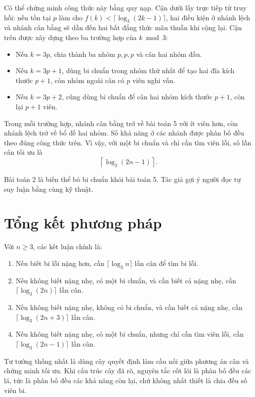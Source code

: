 \documentclass[11pt]{article}
\begin{document}
Có thể chứng minh công thức này bằng quy nạp. Cận dưới lấy trực tiếp từ truy
hồi: nếu tồn tại \(p\) làm cho \(f(k)<\lceil\log_3(2k-1)\rceil\), hai điều
kiện ở nhánh lệch và nhánh cân bằng sẽ dẫn đến hai bất đẳng thức mâu thuẫn
khi cộng lại. Cận trên được xây dựng theo ba trường hợp của \(k\bmod 3\):

\begin{itemize}
  \item Nếu \(k=3p\), chia thành ba nhóm \(p,p,p\) và cân hai nhóm đầu.
  \item Nếu \(k=3p+1\), dùng bi chuẩn trong nhóm thứ nhất để tạo hai đĩa kích
  thước \(p+1\), còn nhóm ngoài cân có \(p\) viên nghi vấn.
  \item Nếu \(k=3p+2\), cũng dùng bi chuẩn để cân hai nhóm kích thước
  \(p+1\), còn lại \(p+1\) viên.
\end{itemize}

Trong mỗi trường hợp, nhánh cân bằng trở về bài toán 5 với ít viên hơn, còn
nhánh lệch trở về bổ đề hai nhóm. Số khả năng ở các nhánh được phân bố đều
theo đúng công thức trên. Vì vậy, với một bi chuẩn và chỉ cần tìm viên lỗi,
số lần cân tối ưu là
\[
  \left\lceil \log_3(2n-1) \right\rceil .
\]

Bài toán 2 là biến thể bỏ bi chuẩn khỏi bài toán 5. Tác giả gợi ý người đọc
tự suy luận bằng cùng kỹ thuật.

\section{Tổng kết phương pháp}

Với \(n\ge 3\), các kết luận chính là:

\begin{enumerate}
  \item Nếu biết bi lỗi nặng hơn, cần
  \(\lceil\log_3 n\rceil\) lần cân để tìm bi lỗi.
  \item Nếu không biết nặng nhẹ, có một bi chuẩn, và cần biết cả nặng nhẹ, cần
  \(\lceil\log_3(2n)\rceil\) lần cân.
  \item Nếu không biết nặng nhẹ, không có bi chuẩn, và cần biết cả nặng nhẹ,
  cần \(\lceil\log_3(2n+3)\rceil\) lần cân.
  \item Nếu không biết nặng nhẹ, có một bi chuẩn, nhưng chỉ cần tìm viên lỗi,
  cần \(\lceil\log_3(2n-1)\rceil\) lần cân.
\end{enumerate}

Tư tưởng thống nhất là dùng cây quyết định làm cầu nối giữa phương án cân và
chứng minh tối ưu. Khi cấu trúc cây đã rõ, nguyên tắc cốt lõi là phân bố đều
các lá, tức là phân bố đều các khả năng còn lại, chứ không nhất thiết là chia
đều số viên bi.
\end{document}
